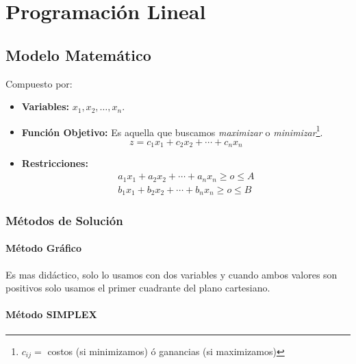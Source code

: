 \documentclass[10pt,a4paper]{book}
\begin{document}

\chapter{Programación Lineal}
\section{Modelo Matemático}
Compuesto por:
\begin{itemize}
\item \textbf{Variables:} $x_1,x_2,\ldots ,x_n$.
\item \textbf{Función Objetivo:} Es aquella que buscamos \textit{maximizar} o \textit{minimizar}\footnote{$c_{ij}=$ costos (si minimizamos) ó ganancias (si maximizamos)}. 
$$z = c_1 x_1 + c_2 x_2 + \cdots +c_n x_n$$
\item \textbf{Restricciones:}
\begin{align*}
a_1 x_1 + a_2 x_2 + \cdots + a_n x_n \geq o \leq A\\
b_1 x_1 + b_2 x_2 + \cdots + b_n x_n \geq o \leq B
\end{align*}
\end{itemize}
\subsection{Métodos de Solución}
\subsubsection{Método Gráfico}
Es mas didáctico, solo lo usamos con dos variables y cuando ambos valores son positivos solo usamos el primer cuadrante del plano cartesiano.
\subsubsection{Método SIMPLEX}
\end{document}
